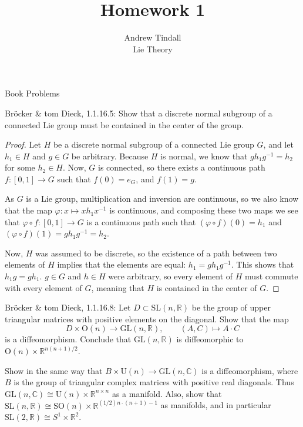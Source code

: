 \documentclass[12pt]{article}
\newcommand{\R}{\mathbb{R}}
\newcommand{\C}{\mathbb{C}}
\theoremstyle{definition}
\newenvironment{problem}[2][Problem]{\begin{trivlist}
\item[\hskip \labelsep {\bfseries #1}\hskip \labelsep {\bfseries #2.}]}{\end{trivlist}}
\begin{document}
 
 
\title{Homework 1}
\author{Andrew Tindall\\
Lie Theory}
 
\maketitle
\begin{section}{Book Problems}
\begin{problem}{1}
	Br\"ocker \& tom Dieck, 1.1.16.5: Show that a discrete normal subgroup of a connected Lie group must be contained in the center of the group.
\end{problem}
\begin{proof}
	Let $H$ be a discrete normal subgroup of a connected Lie group $G$, and let $h_1 \in H$ and $g \in G$ be arbitrary. Because $H$ is normal, we know that $gh_1g^{-1} = h_2$ for some $h_2 \in H$. Now, $G$ is connected, so there exists a continuous path $f: [0,1] \to G$ such that $f(0) = e_G$, and $f(1) = g$. 
	\par As $G$ is a Lie group, multiplication and inversion are continuous, so we also know that the map $\varphi: x \mapsto xh_1x^{-1}$ is continuous, and composing these two maps we see that $\varphi \circ f : [0,1] \to G$ is a continuous path such that $(\varphi \circ f )(0) = h_1$ and $(\varphi \circ f)(1) = gh_1g^{-1} = h_2$. 
	\par Now, $H$ was assumed to be discrete, so the existence of a path between two elements of $H$ implies that the elements are equal: $h_1 = gh_1g^{-1}$. This shows that $h_1g = gh_1$. $g \in G$ and $h \in H$ were arbitrary, so every element of $H$ must commute with every element of $G$, meaning that $H$ is contained in the center of $G$.
\end{proof}
\begin{problem}{2}
	Br\"ocker \& tom Dieck, 1.1.16.8: Let $D \subset \text{SL}(n, \R)$ be the group of upper triangular matrices with positive elements on the diagonal. Show that the map 
	\[D \times \text{O}(n) \to \text{GL}(n, \R), \qquad (A,C)\mapsto A \cdot C\]
	is a diffeomorphism. Conclude that $\text{GL}(n, \R)$ is diffeomorphic to $\text{O}(n) \times \R^{n(n+1)/2}$.
	\par Show in the same way that $B \times \text{U}(n) \to \text{GL}(n, \C)$ is a diffeomorphism, where $B$ is the group of triangular complex matrices with positive real diagonals. Thus $\text{GL}(n, \C) \cong \text{U}(n) \times \R^{n \times n}$ as a manifold. Also, show that $\text{SL}(n,\R) \cong \text{SO}(n) \times \R^{(1/2)n\cdot (n+1)- 1}$ as manifolds, and in particular $\text{SL}(2, \R) \cong S^1 \times \R^2$.

\end{problem}
\end{section}
\end{document}
